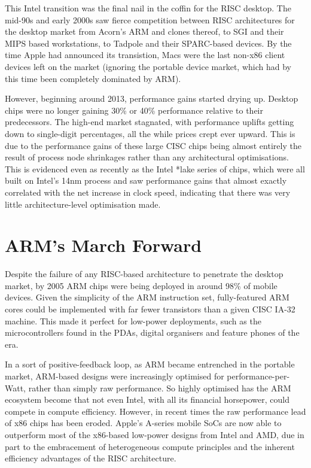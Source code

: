 \documentclass[12pt]{report}
\begin{document}
This Intel transition was the final nail in the coffin for the RISC desktop. The mid-90s and early 2000s saw fierce
competition between RISC architectures for the desktop market from Acorn's ARM and clones thereof, to SGI and their MIPS
based workstations, to Tadpole and their SPARC-based devices. By the time Apple had announced its transistion, Macs were
the last non-x86 client devices left on the market (ignoring the portable device market, which had by this time been
completely dominated by ARM).

However, beginning around 2013, performance gains started drying up. Desktop chips were no longer gaining 30\% or 40\%
performance relative to their predecessors. The high-end market stagnated, with performance uplifts getting down to single-digit
percentages, all the while prices crept ever upward. This is due to the performance gains of these large CISC chips being
almost entirely the result of process node shrinkages rather than any architectural optimisations. This is evidenced even
as recently as the Intel *lake series of chips, which were all built on Intel's 14nm process and saw performance gains that
almost exactly correlated with the net increase in clock speed, indicating that there was very little architecture-level
optimisation made.

\section{ARM's March Forward}
Despite the failure of any RISC-based architecture to penetrate the desktop market, by 2005 ARM chips were being deployed
in around 98\% of mobile devices. Given the simplicity of the ARM instruction set, fully-featured ARM cores could be
implemented with far fewer transistors than a given CISC IA-32 machine. This made it perfect for low-power deployments,
such as the microcontrollers found in the PDAs, digital organisers and feature phones of the era.

In a sort of positive-feedback loop, as ARM became entrenched in the portable market, ARM-based designs were increasingly
optimised for performance-per-Watt, rather than simply raw performance. So highly optimised has the ARM ecosystem become
that not even Intel, with all its financial horsepower, could compete in compute efficiency. However, in recent times the
raw performance lead of x86 chips has been eroded. Apple's A-series mobile SoCs are now able to outperform most of the
x86-based low-power designs from Intel and AMD, due in part to the embracement of heterogeneous compute principles and
the inherent efficiency advantages of the RISC architecture.
\end{document}
